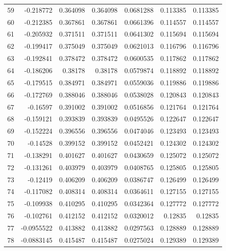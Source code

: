 \begin{tabular}{rrrrrrr}
  59 & -0.218772    & 0.364098    & 0.364098    &  0.0681288   & 0.113385    & 0.113385    \\
  60 & -0.212385    & 0.367861    & 0.367861    &  0.0661396   & 0.114557    & 0.114557    \\
  61 & -0.205932    & 0.371511    & 0.371511    &  0.0641302   & 0.115694    & 0.115694    \\
  62 & -0.199417    & 0.375049    & 0.375049    &  0.0621013   & 0.116796    & 0.116796    \\
  63 & -0.192841    & 0.378472    & 0.378472    &  0.0600535   & 0.117862    & 0.117862    \\
  64 & -0.186206    & 0.38178     & 0.38178     &  0.0579874   & 0.118892    & 0.118892    \\
  65 & -0.179515    & 0.384971    & 0.384971    &  0.0559036   & 0.119886    & 0.119886    \\
  66 & -0.172769    & 0.388046    & 0.388046    &  0.0538028   & 0.120843    & 0.120843    \\
  67 & -0.16597     & 0.391002    & 0.391002    &  0.0516856   & 0.121764    & 0.121764    \\
  68 & -0.159121    & 0.393839    & 0.393839    &  0.0495526   & 0.122647    & 0.122647    \\
  69 & -0.152224    & 0.396556    & 0.396556    &  0.0474046   & 0.123493    & 0.123493    \\
  70 & -0.14528     & 0.399152    & 0.399152    &  0.0452421   & 0.124302    & 0.124302    \\
  71 & -0.138291    & 0.401627    & 0.401627    &  0.0430659   & 0.125072    & 0.125072    \\
  72 & -0.131261    & 0.403979    & 0.403979    &  0.0408765   & 0.125805    & 0.125805    \\
  73 & -0.12419     & 0.406209    & 0.406209    &  0.0386747   & 0.126499    & 0.126499    \\
  74 & -0.117082    & 0.408314    & 0.408314    &  0.0364611   & 0.127155    & 0.127155    \\
  75 & -0.109938    & 0.410295    & 0.410295    &  0.0342364   & 0.127772    & 0.127772    \\
  76 & -0.102761    & 0.412152    & 0.412152    &  0.0320012   & 0.12835     & 0.12835     \\
  77 & -0.0955522   & 0.413882    & 0.413882    &  0.0297563   & 0.128889    & 0.128889    \\
  78 & -0.0883145   & 0.415487    & 0.415487    &  0.0275024   & 0.129389    & 0.129389    \\

\end{tabular}
